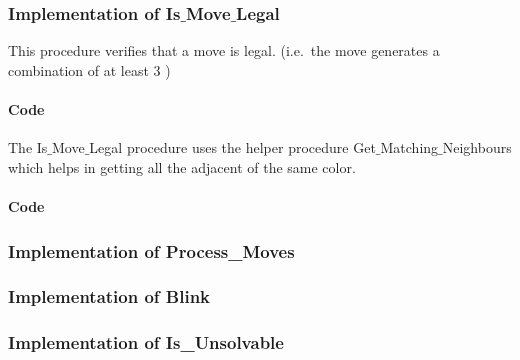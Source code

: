 \subsubsection{Implementation of Is$\_$Move$\_$Legal}

This procedure verifies that a move is legal. (i.e.\  the move generates a combination of at least 3 \sqs)

\paragraph{Code}
\noindent
\begin{centering}

\end{centering}

The Is$\_$Move$\_$Legal procedure uses the helper procedure Get$\_$Matching$\_$Neighbours which helps in getting all the adjacent \sqs of the same color.

\paragraph{Code}
\noindent
\begin{centering}

\end{centering}

\subsubsection{Implementation of Process\_Moves}


\newpage

\subsubsection{Implementation of Blink}


\newpage

\subsubsection{Implementation of Is\_Unsolvable}


\newpage

